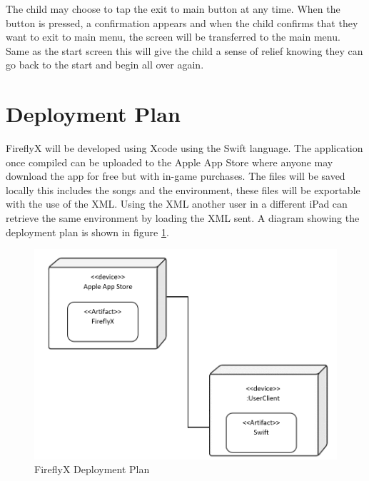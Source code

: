 The child may choose to tap the exit to main button at any time. When the button is pressed, a confirmation appears and when the child confirms that they want to exit to main menu, the screen will be transferred to the main menu. Same as the start screen this will give the child a sense of relief knowing they can go back to the start and begin all over again.


\section{Deployment Plan}
FireflyX will be developed using Xcode using the Swift language. The application once compiled can be uploaded to the Apple App Store where anyone may download the app for free but with in-game purchases. The files will be saved locally this includes the songs and the environment, these files will be exportable with the use of the XML. Using the XML another user in a different iPad can retrieve the same environment by loading the XML sent. A diagram showing the deployment plan is shown in figure \ref{deploymentPlan}.

\begin{figure}[H]
    \centering
    \includegraphics[width=15cm]{figures/deploymentPlan.png}
    \caption{FireflyX Deployment Plan}
    \label{deploymentPlan}
\end{figure}